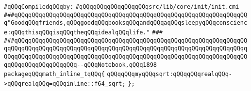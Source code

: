 \label{src/lib/core/init/math-built-in.pkg}
\newline
\verb|#qQQqCompiledqQQqby:|\newline
\verb|#qQQqqQQqqQQqqQQqqQQqsrc/lib/core/init/init.cmi|\newline
\newline
\newline
\newline
\verb|###qQQqqQQqqQQqqQQqqQQqqQQqqQQqqQQqqQQqqQQqqQQqqQQqqQQqqQQqqQQqqQQqqQQq"GoodqQQqfriends,qQQqgoodqQQqbooksqQQqandqQQqaqQQqsleepyqQQqconscience:qQQqthisqQQqisqQQqtheqQQqidealqQQqlife."|\newline
\verb|###|\newline
\verb|###qQQqqQQqqQQqqQQqqQQqqQQqqQQqqQQqqQQqqQQqqQQqqQQqqQQqqQQqqQQqqQQqqQQqqQQqqQQqqQQqqQQqqQQqqQQqqQQqqQQqqQQqqQQqqQQqqQQqqQQqqQQqqQQqqQQqqQQqqQQqqQQqqQQqqQQqqQQqqQQqqQQqqQQqqQQqqQQqqQQqqQQqqQQqqQQqqQQqqQQqqQQqqQQqqQQqqQQqqQQqqQQqqQQq--qQQqNotebook,qQQq1898|\newline
\newline
\newline
\newline
\verb|packageqQQqmath_inline_tqQQq{|\newline
\verb|qQQqqQQqmyqQQqsqrt:qQQqqQQqrealqQQq->qQQqrealqQQq=qQQqinline::f64_sqrt;|\newline
\verb|};|\newline

